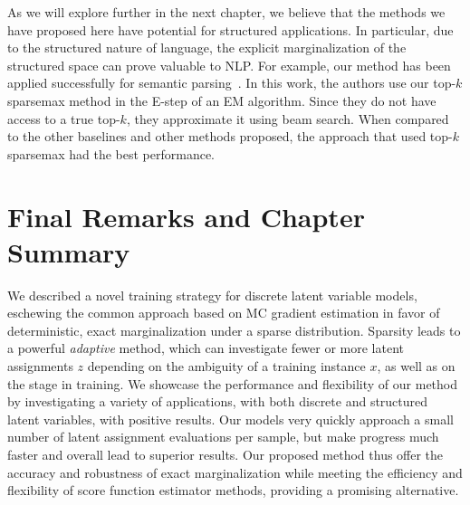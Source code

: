 As we will explore further in the next chapter, we believe that the
methods we have proposed here have potential for structured
applications. In particular, due to the structured nature of
language, the explicit marginalization of the structured space can
prove valuable to NLP. For example, our method has been applied
successfully for semantic
parsing~\citep{wang2021LearningExecutionsSemantic}. In this work, the
authors use our top-$k$ sparsemax method in the E-step of an EM
algorithm. Since they do not have access to a true top-$k$, they
approximate it using beam search. When compared to the other
baselines and other methods proposed, the approach that used top-$k$
sparsemax had the best performance.

\section{Final Remarks and Chapter Summary}

We described a novel training strategy for discrete latent variable
models, eschewing the common approach based on MC gradient estimation
in favor of deterministic, exact marginalization under a sparse
distribution. Sparsity leads to a powerful \emph{adaptive} method,
which can investigate fewer or more latent assignments $z$ depending
on the ambiguity of a training instance $x$, as well as on the stage
in training.
%
We showcase the performance and flexibility of our method by
investigating a variety of applications, with both discrete and
structured latent variables, with positive results. Our models very
quickly approach a small number of latent assignment evaluations per
sample, but make progress much faster and overall lead to superior
results.
%
Our proposed method thus offer the accuracy and robustness of exact
marginalization while meeting the efficiency and flexibility of score
function estimator methods, providing a promising alternative.

\cleardoublepage
